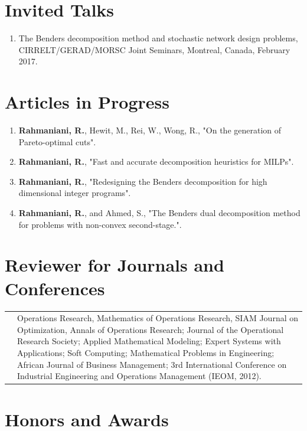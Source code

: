 \documentclass[10PT,letter]{article}
\newcounter{papercnt}
\newcommand{\numbox}[1]{} %
\begin{document}
\section*{\numbox{3}\bfseries\textcolor{titlecol}{\sffamily  Invited Talks }}                  
      \begin{enumerate}
      	\item The Benders decomposition method and stochastic network design problems, CIRRELT/GERAD/MORSC Joint Seminars, Montreal, Canada, February 2017.
      \end{enumerate}
  \section*{\numbox{6}\bfseries\textcolor{titlecol}{\sffamily Articles  in Progress}}
        \begin{enumerate}[itemsep=.5mm]
            \item 
            		\textbf{Rahmaniani, R.}, Hewit, M., Rei, W., Wong, R., "On the generation of  Pareto-optimal cuts".
			\item 
					\textbf{Rahmaniani, R.}, "Fast and accurate decomposition heuristics for MILPs".
		   \item 
					\textbf{Rahmaniani, R.}, "Redesigning the Benders decomposition for high dimensional integer programs".
		  \item 
					\textbf{Rahmaniani, R.}, and Ahmed, S., "The Benders dual decomposition method for problems with non-convex second-stage.".
        \end{enumerate}
        \setcounter{papercnt}{\value{enumi}}

\section*{\numbox{6}\bfseries\textcolor{titlecol}{\sffamily Reviewer  for Journals and Conferences}}
\begin{tabular}{lp{6.5in}}
	   & Operations Research, Mathematics of Operations Research, SIAM Journal on Optimization, Annals of Operations Research; Journal of the Operational Research Society; Applied Mathematical Modeling; Expert Systems with Applications; Soft Computing; Mathematical Problems in Engineering; African Journal of Business Management; 3rd International Conference on Industrial Engineering and Operations Management (IEOM, 2012).
 \end{tabular}

\section*{\numbox{6}\bfseries\textcolor{titlecol}{\sffamily Honors and Awards}}
\end{document}

